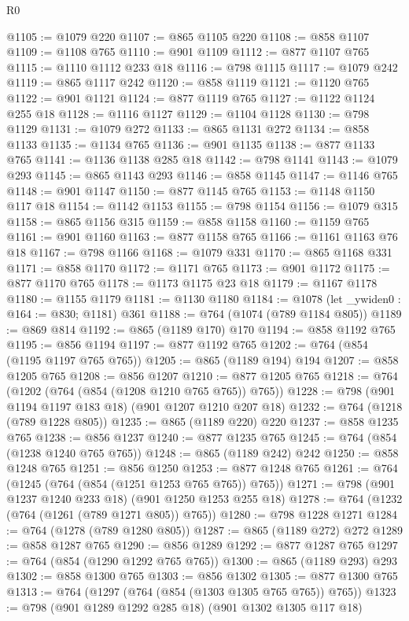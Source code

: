 \begin{lexlean}{R0}
\begin{coremodule}
{{{{{@1105 := @1079 @220
@1107 := @865 @1105 @220
@1108 := @858 @1107
@1109 := @1108 @765
@1110 := @901 @1109
@1112 := @877 @1107 @765
@1115 := @1110 @1112 @233 @18
@1116 := @798 @1115
@1117 := @1079 @242
@1119 := @865 @1117 @242
@1120 := @858 @1119
@1121 := @1120 @765
@1122 := @901 @1121
@1124 := @877 @1119 @765
@1127 := @1122 @1124 @255 @18
@1128 := @1116 @1127
@1129 := @1104 @1128
@1130 := @798 @1129
@1131 := @1079 @272
@1133 := @865 @1131 @272
@1134 := @858 @1133
@1135 := @1134 @765
@1136 := @901 @1135
@1138 := @877 @1133 @765
@1141 := @1136 @1138 @285 @18
@1142 := @798 @1141
@1143 := @1079 @293
@1145 := @865 @1143 @293
@1146 := @858 @1145
@1147 := @1146 @765
@1148 := @901 @1147
@1150 := @877 @1145 @765
@1153 := @1148 @1150 @117 @18
@1154 := @1142 @1153
@1155 := @798 @1154
@1156 := @1079 @315
@1158 := @865 @1156 @315
@1159 := @858 @1158
@1160 := @1159 @765
@1161 := @901 @1160
@1163 := @877 @1158 @765
@1166 := @1161 @1163 @76 @18
@1167 := @798 @1166
@1168 := @1079 @331
@1170 := @865 @1168 @331
@1171 := @858 @1170
@1172 := @1171 @765
@1173 := @901 @1172
@1175 := @877 @1170 @765
@1178 := @1173 @1175 @23 @18
@1179 := @1167 @1178
@1180 := @1155 @1179
@1181 := @1130 @1180
@1184 := @1078 (let _ywiden0 : @164 := @830; @1181) @361
@1188 := @764 (@1074 (@789 @1184 @805))
@1189 := @869 @814
@1192 := @865 (@1189 @170) @170
@1194 := @858 @1192 @765
@1195 := @856 @1194
@1197 := @877 @1192 @765
@1202 := @764 (@854 (@1195 @1197 @765 @765))
@1205 := @865 (@1189 @194) @194
@1207 := @858 @1205 @765
@1208 := @856 @1207
@1210 := @877 @1205 @765
@1218 := @764 (@1202 (@764 (@854 (@1208 @1210 @765 @765)) @765))
@1228 := @798 (@901 @1194 @1197 @183 @18) (@901 @1207 @1210 @207 @18)
@1232 := @764 (@1218 (@789 @1228 @805))
@1235 := @865 (@1189 @220) @220
@1237 := @858 @1235 @765
@1238 := @856 @1237
@1240 := @877 @1235 @765
@1245 := @764 (@854 (@1238 @1240 @765 @765))
@1248 := @865 (@1189 @242) @242
@1250 := @858 @1248 @765
@1251 := @856 @1250
@1253 := @877 @1248 @765
@1261 := @764 (@1245 (@764 (@854 (@1251 @1253 @765 @765)) @765))
@1271 := @798 (@901 @1237 @1240 @233 @18) (@901 @1250 @1253 @255 @18)
@1278 := @764 (@1232 (@764 (@1261 (@789 @1271 @805)) @765))
@1280 := @798 @1228 @1271
@1284 := @764 (@1278 (@789 @1280 @805))
@1287 := @865 (@1189 @272) @272
@1289 := @858 @1287 @765
@1290 := @856 @1289
@1292 := @877 @1287 @765
@1297 := @764 (@854 (@1290 @1292 @765 @765))
@1300 := @865 (@1189 @293) @293
@1302 := @858 @1300 @765
@1303 := @856 @1302
@1305 := @877 @1300 @765
@1313 := @764 (@1297 (@764 (@854 (@1303 @1305 @765 @765)) @765))
@1323 := @798 (@901 @1289 @1292 @285 @18) (@901 @1302 @1305 @117 @18)
}}}}}
\end{coremodule}
\end{lexlean}
